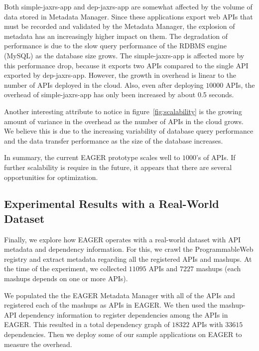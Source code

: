 Both simple-jaxrs-app and dep-jaxrs-app are
somewhat affected by the volume of data stored in Metadata Manager. Since these applications export web APIs that must be 
recorded and validated by the Metadata Manager, the explosion of metadata has an increasingly higher impact on them. The degradation 
of performance is due to the slow query performance of the RDBMS engine (MySQL) as the database size grows. The simple-jaxrs-app
is affected more by this performance drop, because it exports two APIs compared to the single API exported 
by dep-jaxrs-app. However, the growth
in overhead is linear to the number of APIs deployed in the cloud. Also,
even after deploying $10000$ APIs, the overhead of simple-jaxrs-app has only been increased by about 0.5 seconds.

Another interesting attribute to notice in figure~\ref{fig:scalability} is the
growing amount of variance in the overhead as the number of APIs in the cloud
grows.  We believe this is due to the increasing variability of database query
performance and the data transfer performance as the size of the database
increases.

In summary, the current EAGER prototype scales well to $1000$'s of APIs.
If further scalability is require in the future, it appears that there are
several opportunities for optimization.

\subsection{Experimental Results with a Real-World Dataset}

Finally, we explore how EAGER operates with a real-world dataset with API
metadata and dependency information. For this, we crawl the ProgrammableWeb
registry and extract metadata regarding all the registered APIs and mashups.
At the time of the experiment, we collected $11095$ APIs and $7227$ 
mashups (each mashups depends on one or more APIs).

We populated the the EAGER Metadata Manager with all of the APIs and
registered each of the mashups as APIs in EAGER. We then used the
mashup-API dependency information to register dependencies among the APIs in 
EAGER. This resulted in a 
total dependency graph of $18322$ APIs with $33615$ dependencies. 
Then we deploy
some of our sample applications on EAGER to measure the overhead.


